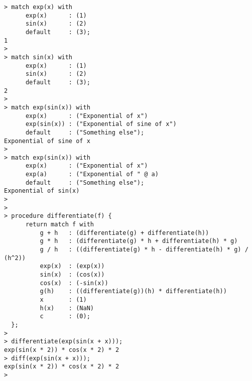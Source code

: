 \begin{center}\begin{minipage}{15cm}\begin{Verbatim}[frame=single]
> match exp(x) with 
      exp(x)      : (1) 
      sin(x)      : (2)
      default     : (3);
1
> 
> match sin(x) with 
      exp(x)      : (1) 
      sin(x)      : (2)
      default     : (3);
2
> 
> match exp(sin(x)) with
      exp(x)      : ("Exponential of x")
      exp(sin(x)) : ("Exponential of sine of x")
      default     : ("Something else");
Exponential of sine of x
> 
> match exp(sin(x)) with
      exp(x)      : ("Exponential of x")
      exp(a)      : ("Exponential of " @ a)
      default     : ("Something else");
Exponential of sin(x)
> 
> 
> procedure differentiate(f) {
      return match f with 
          g + h   : (differentiate(g) + differentiate(h))
          g * h   : (differentiate(g) * h + differentiate(h) * g)
          g / h   : ((differentiate(g) * h - differentiate(h) * g) / (h^2))
          exp(x)  : (exp(x))
          sin(x)  : (cos(x))
          cos(x)  : (-sin(x))
          g(h)    : ((differentiate(g))(h) * differentiate(h))
          x       : (1)
          h(x)    : (NaN)
          c       : (0);
  };
> 
> differentiate(exp(sin(x + x)));
exp(sin(x * 2)) * cos(x * 2) * 2
> diff(exp(sin(x + x)));
exp(sin(x * 2)) * cos(x * 2) * 2
> 
\end{Verbatim}
\end{minipage}\end{center}
